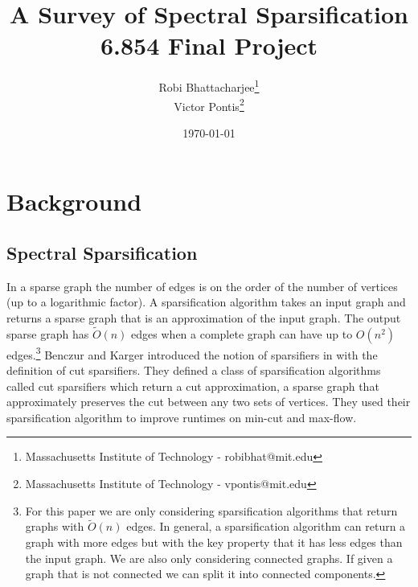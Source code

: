 \documentclass[12pt,twoside]{article}
\title{A Survey of Spectral Sparsification \\
        6.854 Final Project}
\date{\today}
\author{Robi Bhattacharjee\thanks{Massachusetts Institute of Technology - robibhat@mit.edu} \\
        Victor Pontis\thanks{Massachusetts Institute of Technology - vpontis@mit.edu} }
\begin{document}
\maketitle


\tableofcontents

\section{Background}

\subsection{Spectral Sparsification}

In a sparse graph the number of edges is on the order of the number of vertices (up to a logarithmic factor). A sparsification algorithm takes an input graph and returns a sparse graph that is an approximation of the input graph. The output sparse graph has $\tilde{O}(n)$ edges when a complete graph can have up to $O(n^2)$ edges.\footnote{For this paper we are only considering sparsification algorithms that return graphs with $\tilde{O}(n)$ edges. In general, a sparsification algorithm can return a graph with more edges but with the key property that it has less edges than the input graph. We are also only considering connected graphs. If given a graph that is not connected we can split it into connected components.} Benczur and Karger introduced the notion of sparsifiers in  \cite{benczur-karger-mincut} with the definition of cut sparsifiers. They defined a class of sparsification algorithms called cut sparsifiers which return a cut approximation, a sparse graph that approximately preserves the cut between any two sets of vertices. They used their sparsification algorithm to improve runtimes on min-cut and max-flow. 
\end{document}
